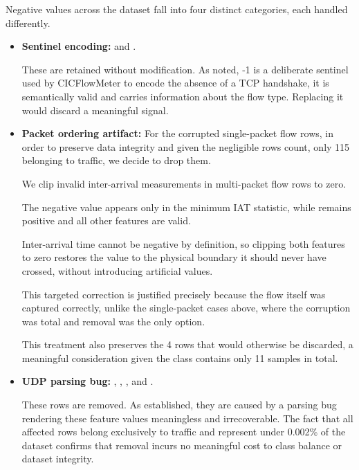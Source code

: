 Negative values across the dataset fall into four distinct categories, each handled differently.
\begin{itemize}
    \item \textbf{Sentinel encoding:}  and .

          These are retained without modification. As noted, -1 is a deliberate sentinel used by CICFlowMeter to encode the absence of a TCP handshake, it is semantically valid and carries information about the flow type. Replacing it would discard a meaningful signal.

    \item \textbf{Packet ordering artifact:}  For the corrupted single-packet flow rows, in order to preserve data integrity and given the negligible rows count, only 115 belonging to  traffic, we decide to drop them.

          We clip invalid inter-arrival measurements in multi-packet flow rows to zero.

          The negative value appears only in the minimum IAT statistic, while  remains positive and all other features are valid.

          Inter-arrival time cannot be negative by definition, so clipping both features to zero restores the value to the physical boundary it should never have crossed, without introducing artificial values.

          This targeted correction is justified precisely because the flow itself was captured correctly, unlike the single-packet cases above, where the corruption was total and removal was the only option.

          This treatment also preserves the 4  rows that would otherwise be discarded, a meaningful consideration given the class contains only 11 samples in total.

    \item \textbf{UDP parsing bug:} , , , and .

          These rows are removed. As established, they are caused by a parsing bug rendering these feature values meaningless and irrecoverable. The fact that all affected rows belong exclusively to  traffic and represent under 0.002\% of the dataset confirms that removal incurs no meaningful cost to class balance or dataset integrity.
\end{itemize}

